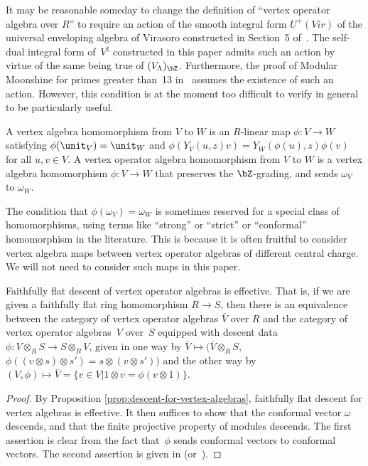 \begin{rem}It may be reasonable someday to change the definition of ``vertex operator algebra over $R$'' to require an action of the smooth integral form $U^+(Vir)$ of the universal enveloping algebra of Virasoro constructed in Section~5 of~\cite{B99}. The self-dual integral form of~$V^\natural$ constructed in this paper admits such an action by virtue of the same being true of $(V_\Lambda)_{\bZ}$. Furthermore, the proof of Modular Moonshine for primes greater than~13 in~\cite{B98} assumes the existence of such an action. However, this condition is at the moment too difficult to verify in general to be particularly useful.
\end{rem}

\begin{defn}A vertex algebra homomorphism from $V$ to $W$ is an $R$-linear map $\phi\colon V \to W$ satisfying $\phi(\unit_V) = \unit_W$ and $\phi(Y_V(u,z)v) = Y_W(\phi(u),z)\phi(v)$ for all $u,v \in V$. A vertex operator algebra homomorphism from $V$ to $W$ is a vertex algebra homomorphism $\phi\colon V \to W$ that preserves the $\bZ$-grading, and sends $\omega_V$ to $\omega_W$.
\end{defn}

\begin{rem}The condition that $\phi(\omega_V) = \omega_W$ is sometimes reserved for a special class of homomorphisms, using terms like ``strong'' or ``strict'' or ``conformal'' homomorphism in the literature. This is because it is often fruitful to consider vertex algebra maps between vertex operator algebras of different central charge. We will not need to consider such maps in this paper.
\end{rem}

\begin{prop} \label{prop:faithfully-flat-descent-for-voas}Faithfully flat descent of vertex operator algebras is effective. That is, if we are given a faithfully flat ring homomorphism $R \to S$, then there is an equivalence between the category of vertex operator algebras $\bar{V}$ over $R$ and the category of vertex operator algebras~$V$ over~$S$ equipped with descent data $\phi\colon V \otimes_{R} S \to S \otimes_{R} V$, given in one way by $\bar{V} \mapsto (\bar{V} \otimes_{R} S,$ $\phi((v \otimes s) \otimes s') = s \otimes (v \otimes s'))$ and the other way by $(V, \phi) \mapsto \bar{V} = \{v \in V | 1 \otimes v = \phi(v \otimes 1)\}$.
\end{prop}
\begin{proof}By Proposition \ref{prop:descent-for-vertex-algebras}, faithfully flat descent for vertex algebras is effective. It then suffices to show that the conformal vector $\omega$ descends, and that the finite projective property of modules descends. The first assertion is clear from the fact that~$\phi$ sends conformal vectors to conformal vectors. The second assertion is given in \cite[\href{https://stacks.math.columbia.edu/tag/058S}{Proposition 058S}]{Stacks} (or~\cite[Proposition~2.5.2]{EGA4v2}).
\end{proof}


